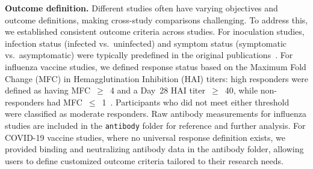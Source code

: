 \documentclass[
  12pt]{article}
\begin{document}
\noindent\textbf{Outcome definition.}
Different studies often have varying objectives and outcome definitions, making cross-study comparisons challenging. To address this, we established consistent outcome criteria across studies. For inoculation studies, infection status (infected vs.\ uninfected) and symptom status (symptomatic vs.\ asymptomatic) were typically predefined in the original publications~\citep{liu2016individualized,habibi2020neutrophilic,proud2008gene,davenport2015transcriptomic,muller2017development}. For influenza vaccine studies, we defined response status based on the Maximum Fold Change (MFC) in Hemagglutination Inhibition (HAI) titers: high responders were defined as having MFC~$\geq$~4 and a Day~28 HAI titer~$\geq$~40, while non-responders had MFC~$\leq$~1~\citep{hipc2017multicohort}. Participants who did not meet either threshold were classified as moderate responders. Raw antibody measurements for influenza studies are included in the \texttt{antibody} folder for reference and further analysis. For COVID-19 vaccine studies, where no universal response definition exists, we provided binding and neutralizing antibody data in the antibody folder, allowing users to define customized outcome criteria tailored to their research needs.
\end{document}
